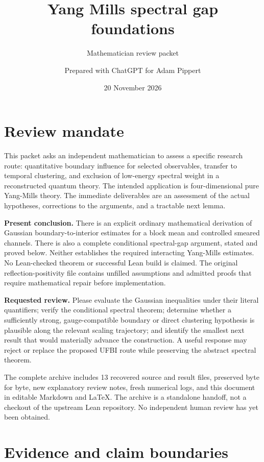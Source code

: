 \documentclass[
  11pt,
  letterpaper,
]{article}
\title{Yang Mills spectral gap foundations}
\subtitle{Mathematician review packet}
\author{Prepared with ChatGPT for Adam Pippert}
\date{20 November 2026}
\let\oldtableofcontents\tableofcontents
\renewcommand{\tableofcontents}{\oldtableofcontents\clearpage}
\begin{document}
\maketitle

{
\setcounter{tocdepth}{2}
\tableofcontents
}
\section{Review mandate}\label{review-mandate}

This packet asks an independent mathematician to assess a specific
research route: quantitative boundary influence for selected
observables, transfer to temporal clustering, and exclusion of
low-energy spectral weight in a reconstructed quantum theory. The
intended application is four-dimensional pure Yang-Mills theory. The
immediate deliverables are an assessment of the actual hypotheses,
corrections to the arguments, and a tractable next lemma.

\textbf{Present conclusion.} There is an explicit ordinary mathematical
derivation of Gaussian boundary-to-interior estimates for a block mean
and controlled smeared channels. There is also a complete conditional
spectral-gap argument, stated and proved below. Neither establishes the
required interacting Yang-Mills estimates. No Lean-checked theorem or
successful Lean build is claimed. The original reflection-positivity
file contains unfilled assumptions and admitted proofs that require
mathematical repair before implementation.

\textbf{Requested review.} Please evaluate the Gaussian inequalities
under their literal quantifiers; verify the conditional spectral
theorem; determine whether a sufficiently strong, gauge-compatible
boundary or direct clustering hypothesis is plausible along the relevant
scaling trajectory; and identify the smallest next result that would
materially advance the construction. A useful response may reject or
replace the proposed UFBI route while preserving the abstract spectral
theorem.

The complete archive includes 13 recovered source and result files,
preserved byte for byte, new explanatory review notes, fresh numerical
logs, and this document in editable Markdown and LaTeX. The archive is a
standalone handoff, not a checkout of the upstream Lean repository. No
independent human review has yet been obtained.

\section{Evidence and claim
boundaries}\label{evidence-and-claim-boundaries}
\end{document}

